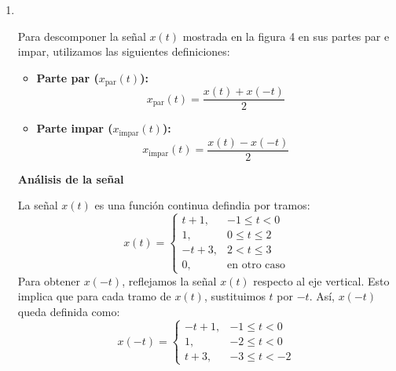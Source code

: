 \begin{enumerate}[label=\color{red}\textbf{\arabic*)}]
\begin{center}
    \end{center}
\item {}
    \begin{center}
        \\
    \end{center}

    Para descomponer la señal $x(t)$ mostrada en la figura 4 en sus partes par e impar, utilizamos las siguientes definiciones:
    \begin{itemize}[label=\textbullet]
        \item \textbf{Parte par ($x_{\text{par}}(t)$):}
            \[
            x_{\text{par}}(t)=\dfrac{x(t)+x(-t)}{2}
            \] 
        \item \textbf{Parte impar ($x_{\text{impar}}(t)$):}
            \[
            x_{\text{impar}}(t)=\dfrac{x(t)-x(-t)}{2}
            \] 
    \end{itemize}
    \textbf{Análisis de la señal}

    La señal $x(t)$ es una función continua defindia por tramos:  \[
    x(t)=\begin{cases}
        t+1, & -1\le t<0\\
        1, & 0\le t\le 2\\
        -t+3, & 2<t\le 3\\
        0, & \text{en otro caso}
    \end{cases}
    \] 
    Para obtener $x(-t)$, reflejamos la señal  $x(t)$ respecto al eje vertical. Esto implica que para cada tramo de  $x(t)$, sustituimos  $t$ por  $-t$. Así,  $x(-t)$ queda definida como:  \[
    x(-t)=\begin{cases}
        -t+1, & -1\le t<0\\
        1, & -2\le t<0\\
        t+3, & -3\le t<-2
    \end{cases}
    \] 


\end{enumerate}
